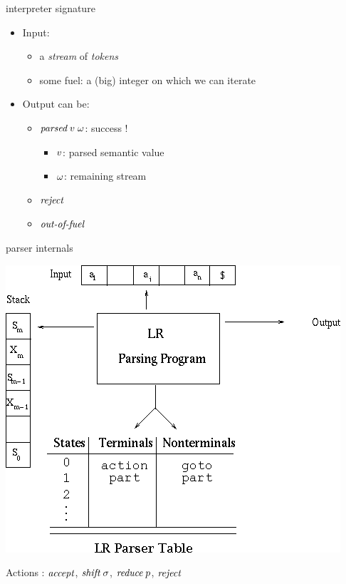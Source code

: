 \documentclass{beamer}
\begin{document}
\begin{frame}{\lrone interpreter signature}
\begin{itemize}
\item Input:
  \begin{itemize}
  \item a \emph{stream} of \emph{tokens}
  \item some fuel: a (big) integer on which we can iterate
  \end{itemize}
\item Output can be:
  \begin{itemize}
  \item $\textit{parsed}\;v\;\omega$: success !
    \begin{itemize}
      \item $v$: parsed semantic value
      \item $\omega$: remaining stream
    \end{itemize}
  \item $\textit{reject}$
  \item $\textit{out-of-fuel}$
  \end{itemize}
\end{itemize}
\end{frame}

\begin{frame}{\lrone parser internals}
\begin{center}
\includegraphics[height=0.7\textheight]{imageLR.png}
\end{center}
Actions : $\textit{accept}$, $\textit{shift}\;\sigma$, $\textit{reduce}\;p$, $\textit{reject}$
\end{frame}
\end{document}
